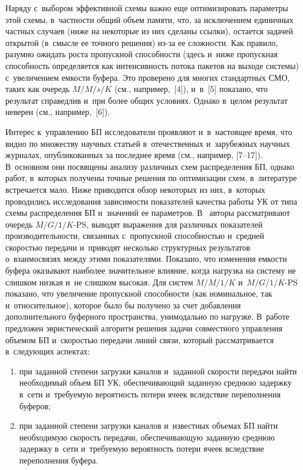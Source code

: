 \begin{multicols}{2}
  Наряду с~выбором эффективной схемы важ\-но еще оптимизировать 
па\-ра\-мет\-ры этой схемы, в~част\-ности общий объ\-ем памяти, что, за исключением 
единичных част\-ных случаев (ниже на некоторые из них сделаны ссылки), 
остается задачей открытой (в~смыс\-ле ее точ\-но\-го решения) из-за ее слож\-ности. 
Как правило, ра\-зум\-но ожидать рос\-та про\-пуск\-ной спо\-соб\-ности (здесь и~ниже 
про\-пуск\-ная спо\-соб\-ность определяется как ин\-тен\-сив\-ность потока пакетов на 
выходе сис\-те\-мы) с~увеличением ем\-кости буфера. Это проверено для многих 
стандартных СМО, таких как очередь $M/M/s/K$ 
(см., например,~[4]), и~в~[5] показано, что результат спра\-вед\-лив и~при более 
общих условиях. Однако в~целом результат неверен (см., например,~[6]). 
  
  Интерес к~управлению БП исследователи проявляют и~в~на\-сто\-ящее время, 
что вид\-но по множеству научных статьей в~отечественных и~за\-ру\-беж\-ных 
на\-уч\-ных журналах, опуб\-ли\-ко\-ван\-ных за по\-след\-нее время (см., например, [7--17]). 
В~основном они по\-свя\-ще\-ны анализу раз\-лич\-ных схем рас\-пре\-де\-ле\-ния БП, 
однако работ, в~которых получены точ\-ные решения по оптимизации схем, 
в~литературе встречается мало. Ниже приводится об\-зор некоторых из них, 
в~которых проводились исследования за\-ви\-си\-мости показателей качества работы 
УК от типа схемы рас\-пре\-де\-ле\-ния БП и~значений ее па\-ра\-мет\-ров. В~\cite{7-ag} 
авторы рас\-смат\-ри\-ва\-ют очередь $M/G/1/K\mbox{-}\mathrm{PS}$, выводят выражения для 
раз\-лич\-ных показателей про\-из\-во\-ди\-тель\-ности, связанных с~про\-пуск\-ной 
спо\-соб\-ностью и~сред\-ней ско\-ростью передачи и~приводят несколько 
структурных результатов о~взаимосвязях меж\-ду этими показателями. Показано, 
что изменения ем\-кости буфера оказывают наиболее значительное влияние, 
когда на\-груз\-ка на сис\-те\-му не слиш\-ком низ\-кая и~не слиш\-ком высокая. Для 
систем $M/M/1/K$ и~$M/G/1/K\mbox{-}\mathrm{PS}$ показано, что увеличение 
про\-пуск\-ной спо\-соб\-ности (как номинальное, так и~относительное), которое было 
бы получено за счет до\-бав\-ле\-ния дополнительного буферного пространства, 
унимодально по на\-груз\-ке. В~работе~\cite{8-ag} предложен эвристический 
алгоритм решения задачи совместного управ\-ле\-ния объемом БП
и~ско\-ростью передачи линий связи, который рас\-смат\-ри\-ва\-ет\-ся в~сле\-ду\-ющих 
аспектах: 
{

}

\noindent
\begin{enumerate}[(1)]
\item при заданной степени за\-груз\-ки каналов и~заданной ско\-рости 
передачи найти необходимый объем БП УК, 
обес\-пе\-чи\-ва\-ющий заданную сред\-нюю за\-держ\-ку в~сети и~требуемую ве\-ро\-ят\-ность 
потери ячеек вследствие переполнения буферов; 
\item при заданной степени 
за\-груз\-ки каналов и~известных объ\-емах БП найти необходимую 
ско\-рость передачи, обес\-пе\-чи\-ва\-ющую заданную сред\-нюю задержку в~сети 
и~тре\-бу\-емую ве\-ро\-ят\-ность потери ячеек вследствие переполнения 
буфера.
\end{enumerate}
 

\end{multicols}

